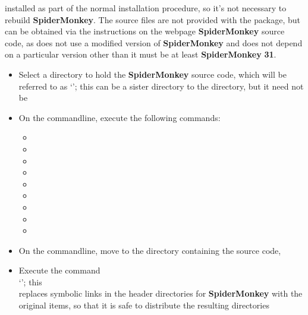 installed as part of the normal \mplusm{} installation procedure, so it's not necessary to
rebuild \textbf{SpiderMonkey}.
The source files are not provided with the  package, but can be obtained
via the instructions on the web\longDash{}page
%
{\textbf{SpiderMonkey} source code}, as \mplusm{} does not use a modified version of
\textbf{SpiderMonkey} and does not depend on a particular version \longDash{} other than
it must be at least \textbf{SpiderMonkey} \textbf{31}.
\begin{itemize}
\item Select a directory to hold the \textbf{SpiderMonkey} source code, which will be
referred to as `'; this can be a sister directory to the
 directory, but it need not be
\item\exSp{} On the command\longDash{}line, execute the following commands:
\begin{itemize}
\item{}
\item\exSp{}
\item\exSp{}
\item\exSp{}
\item\exSp{}
\item\exSp{}
\item\exSp{}
\item\exSp{}
\item\exSp{}
\end{itemize}
\item\exSp{} On the command\longDash{}line, move to the directory containing the \mplusm{}
source code, 
\item\exSp{} Execute the command\\
`';
this\\
replaces symbolic links in the header directories for \textbf{SpiderMonkey} with the
original items, so that it is safe to distribute the resulting directories
\end{itemize}
